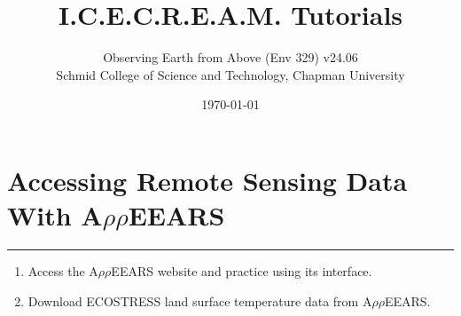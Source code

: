 \documentclass[oneside,a4paper,11pt,explicit]{book}
\title{I.C.E.C.R.E.A.M. Tutorials}
\subtitle{\small Observing Earth from Above (Env 329) v24.06  \\
	\small Schmid College of Science and Technology, Chapman University}
\date{\today}
\begin{document}
\setcounter{tocdepth}{3}
\setcounter{minitocdepth}{3}
\dominitoc
\faketableofcontents

\setcounter{chapter}{3} %

\chapter{Accessing Remote Sensing Data With A$\rho\rho$EEARS} %

\vspace{-2em}

\minitoc

\hrule

\vspace{1em}

\begin{tcolorbox}[enhanced,frame style image=blueshade.png,
	opacityback=0.75,opacitybacktitle=0.25,
	colback=blue!5!white,colframe=blue!75!black,title={\Large \textbf{Objectives:}}]
	\large
	\begin{enumerate}
		\item Access the A$\rho\rho$EEARS website and practice using its interface.
		\item Download ECOSTRESS land surface temperature data from A$\rho\rho$EEARS.
	\end{enumerate}
\end{tcolorbox}

\clearpage
\end{document}
